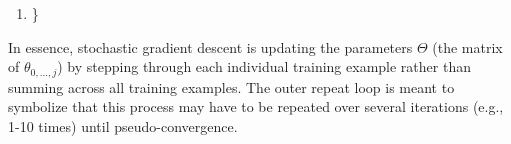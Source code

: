 \documentclass{article}
\begin{document}
\begin{landscape}
\begin{multicols}{2}
\begin{enumerate}
    \item[]\}
\end{enumerate}
In essence, stochastic gradient descent is updating the parameters $\Theta$ (the matrix of $\theta_{0,...,j}$) by stepping through each individual training example rather than summing across all training examples. The outer repeat loop is meant to symbolize that this process may have to be repeated over several iterations (e.g., 1-10 times) until pseudo-convergence.
\end{multicols}
\end{landscape}
\end{document}

